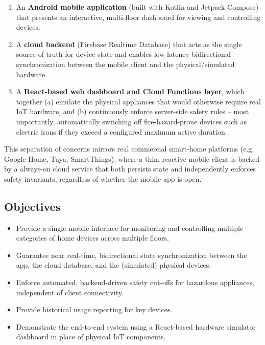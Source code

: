 \documentclass[11pt,a4paper]{article}
\begin{document}
\begin{enumerate}[label=(\roman*)]
    \item An \textbf{Android mobile application} (built with Kotlin and Jetpack Compose) that presents an interactive, multi-floor dashboard for viewing and controlling devices.
    \item A \textbf{cloud backend} (Firebase Realtime Database) that acts as the single source of truth for device state and enables low-latency bidirectional synchronization between the mobile client and the physical/simulated hardware.
    \item A \textbf{React-based web dashboard and Cloud Functions layer}, which together (a) emulate the physical appliances that would otherwise require real IoT hardware, and (b) continuously enforce server-side safety rules -- most importantly, automatically switching off fire-hazard-prone devices such as electric irons if they exceed a configured maximum active duration.
\end{enumerate}

This separation of concerns mirrors real commercial smart-home platforms (e.g. Google Home, Tuya, SmartThings), where a thin, reactive mobile client is backed by a always-on cloud service that both persists state and independently enforces safety invariants, regardless of whether the mobile app is open.

\subsection{Objectives}
\begin{itemize}
    \item Provide a single mobile interface for monitoring and controlling multiple categories of home devices across multiple floors.
    \item Guarantee near real-time, bidirectional state synchronization between the app, the cloud database, and the (simulated) physical devices.
    \item Enforce automated, backend-driven safety cut-offs for hazardous appliances, independent of client connectivity.
    \item Provide historical usage reporting for key devices.
    \item Demonstrate the end-to-end system using a React-based hardware simulator dashboard in place of physical IoT components.
\end{itemize}

\newpage
\end{document}
